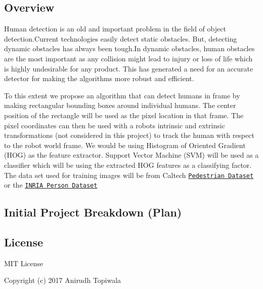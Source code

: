 \href{https://travis-ci.org/anirudhtopiwala/Human_Detector}{\tt } \subsection*{\href{https://coveralls.io/github/anirudhtopiwala/Human_Detector?branch=master}{\tt } }

\subsection*{Overview}

Human detection is an old and important problem in the field of object detection.\+Current technologies easily detect static obstacles. But, detecting dynamic obstacles has always been tough.\+In dynamic obstacles, human obstacles are the most important as any collision might lead to injury or loss of life which is highly undesirable for any product. This has generated a need for an accurate detector for making the algorithms more robust and efficient.

To this extent we propose an algorithm that can detect humans in frame by making rectangular bounding boxes around individual humans. The center position of the rectangle will be used as the pixel location in that frame. The pixel coordinates can then be used with a robots intrinsic and extrinsic transformations (not considered in this project) to track the human with respect to the robot world frame. We would be using Histogram of Oriented Gradient (H\+OG) as the feature extractor. Support Vector Machine (S\+VM) will be used as a classifier which will be using the extracted H\+OG features as a classifying factor. The data set used for training images will be from Caltech \href{http://www.vision.caltech.edu/Image_Datasets/CaltechPedestrians/}{\tt Pedestrian Dataset} or the \href{http://pascal.inrialpes.fr/data/human/}{\tt I\+N\+R\+IA Person Dataset}

\subsection*{Initial Project Breakdown (Plan)}

 

\subsection*{License}

M\+IT License

Copyright (c) 2017 Anirudh Topiwala


